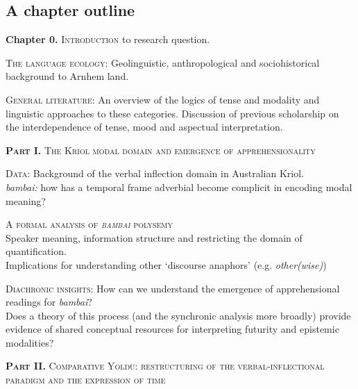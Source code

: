 \documentclass[12pt]{article}
\begin{document}
\subsection{A chapter outline}
\textbf{Chapter 0.} \textsc{Introduction} to research question.
\begin{description}[labelindent=.8cm]


\item[Chapter 1.] \textsc{The language ecology}: Geolinguistic, anthropological and sociohistorical background to Arnhem land.
\item[Chapter 2.] \textsc{General literature:} An overview of the logics of tense and modality and linguistic approaches to these categories. Discussion of previous scholarship on the interdependence of tense, mood and aspectual interpretation.
\end{description}
\textbf{\textsc{Part I.}} \textsc{The Kriol modal domain and emergence of apprehensionality}
\begin{description}[labelindent=.8cm]


\item[Chapter 3.] \textsc{Data}: Background of the verbal inflection domain in Australian Kriol.\\\textit{bambai:} how has a temporal frame adverbial become complicit in encoding modal meaning?
\item[Chapter 4.] \textsc{A formal analysis of \textit{bambai} polysemy}\\Speaker meaning, information structure and restricting the domain of quantification.\\Implications for understanding other `discourse anaphors' (e.g. \textit{other(wise)})
\item[Chapter 5. ] \textsc{Diachronic insights:} How can we understand the emergence of apprehensional readings for \textit{bambai}?\\Does a theory of this process (and the synchronic analysis more broadly) provide evidence of shared conceptual resources for interpreting futurity and epistemic modalities?
\end{description}
\textbf{\textsc{Part II.}} \textsc{Comparative Yolŋu: restructuring of the verbal-inflectional paradigm and the expression of time}
\end{document}
